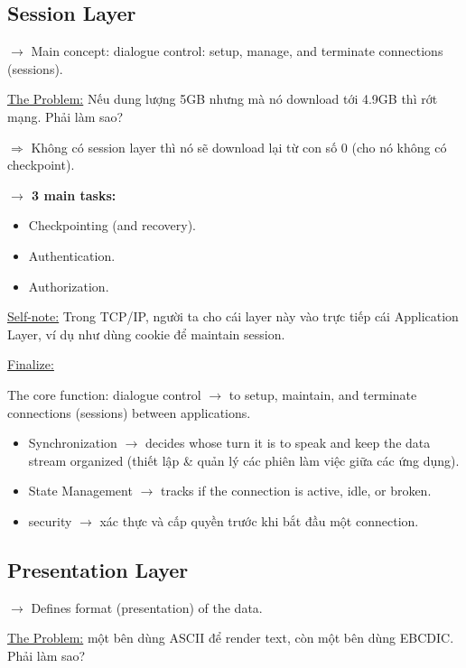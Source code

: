 \subsection{Session Layer}

\noindent
$\rightarrow$ Main concept: dialogue control: setup, manage, and terminate connections (sessions).
\medskip

\noindent
\underline{The Problem:} Nếu dung lượng 5GB nhưng mà nó download tới 4.9GB thì rớt mạng. Phải làm sao?

$\Rightarrow$ Không có session layer thì nó sẽ download lại từ con số 0 (cho nó không có checkpoint).
\medskip

\noindent
\textbf{$\rightarrow$ 3 main tasks:}

\begin{itemize}
    \item Checkpointing (and recovery).
    \item Authentication.
    \item Authorization.
\end{itemize}

\noindent
\underline{Self-note:} Trong TCP/IP, người ta cho cái layer này vào trực tiếp cái Application Layer, ví dụ như dùng cookie để maintain session.
\medskip

\noindent
\underline{Finalize:}
\medskip

\noindent
The core function: dialogue control $\rightarrow$ to setup, maintain, and terminate connections (sessions) between applications.

\begin{itemize}
    \item Synchronization $\rightarrow$ decides whose turn it is to speak and keep the data stream organized (thiết lập \& quản lý các phiên làm việc giữa các ứng dụng).
    \item State Management $\rightarrow$ tracks if the connection is active, idle, or broken.
    \item security $\rightarrow$ xác thực và cấp quyền trước khi bắt đầu một connection.
\end{itemize}

\subsection{Presentation Layer}

\noindent
$\rightarrow$ Defines format (presentation) of the data.
\medskip

\noindent
\underline{The Problem:} một bên dùng ASCII để render text, còn một bên dùng EBCDIC. Phải làm sao?

